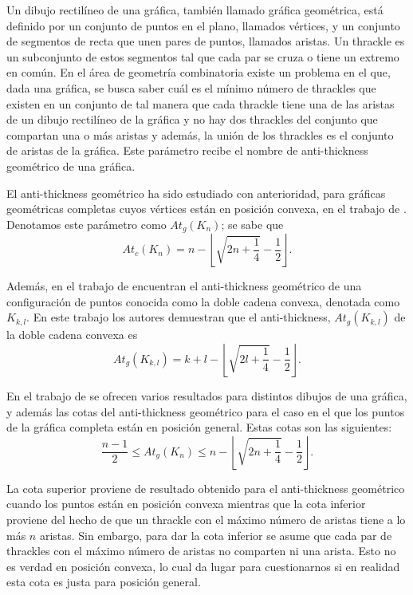 Un dibujo rectilíneo de una gráfica, también llamado gráfica geométrica, está definido por un conjunto de
puntos en el plano, llamados vértices, y un conjunto de segmentos de recta que unen pares de puntos,
llamados aristas. Un thrackle es un subconjunto de estos segmentos tal que cada par se cruza o tiene un
extremo en común. En el área de geometría combinatoria existe un problema en el que, dada una gráfica, se
busca saber cuál es el mínimo número de thrackles que existen en un conjunto de tal manera que cada
thrackle tiene una de las aristas de un dibujo rectilíneo de la gráfica y no hay dos thrackles del conjunto
que compartan una o más aristas y además, la unión de los thrackles es el conjunto de aristas de la
gráfica. Este parámetro recibe el nombre de anti-thickness geométrico de una gráfica.

El anti-thickness geométrico ha sido estudiado con anterioridad, para gráficas geométricas completas cuyos
vértices están en posición convexa, en el trabajo de \cite{Fabila-Monroy2018}. Denotamos este parámetro
como $At_g(K_n)$; se sabe que \[At_c(K_n) = n - \left\lfloor\sqrt{2n + \frac{1}{4}}-
\frac{1}{2}\right\rfloor.\]

Además, en el trabajo de \cite{Lomeli2018} encuentran el anti-thickness geométrico de una configuración de
puntos conocida como la doble cadena convexa, denotada como $K_{k,l}$. En este trabajo los autores
demuestran que el anti-thickness, $At_g(K_{k,l})$ de la doble cadena convexa es \[ At_g(K_{k,l}) = k+l
-\left\lfloor\sqrt{2l + \frac{1}{4}} -\frac{1}{2}\right\rfloor. \]

En el trabajo de \cite{Dujmovic2017} se ofrecen varios resultados para distintos dibujos de una gráfica, y
además las cotas del anti-thickness geométrico para el caso en el que los puntos de la gráfica completa
están en posición general. Estas cotas son las siguientes:
\[ \frac{n-1}{2} \leq At_g(K_n) \leq n - \left\lfloor\sqrt{2n + \frac{1}{4}}- \frac{1}{2}\right\rfloor.\]

La cota superior proviene de resultado obtenido para el anti-thickness geométrico cuando los puntos están
en posición convexa mientras que la cota inferior proviene del hecho de que un thrackle con el máximo
número de aristas tiene a lo más $n$ aristas. Sin embargo, para dar la cota inferior se asume que cada par
de thrackles con el máximo número de aristas no comparten ni una arista. Esto no es verdad en posición
convexa, lo cual da lugar para cuestionarnos si en realidad esta cota es justa para posición general.

